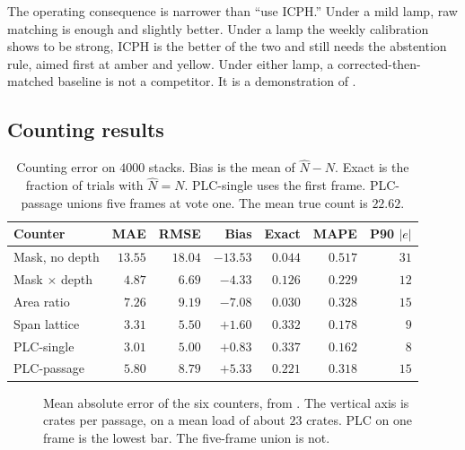 The operating consequence is narrower than ``use ICPH.'' Under a mild lamp, raw matching is enough and slightly better. Under a lamp the weekly calibration shows to be strong, ICPH is the better of the two and still needs the abstention rule, aimed first at amber and yellow. Under either lamp, a corrected-then-matched baseline is not a competitor. It is a demonstration of .

\subsection{Counting results}
\label{sec:count-results}

\begin{table}[t]
\centering
\caption{Counting error on $4000$ stacks. Bias is the mean of $\hat{N}-N$. Exact is the fraction of trials with $\hat{N}=N$. PLC-single uses the first frame. PLC-passage unions five frames at vote one. The mean true count is $22.62$.}
\label{tab:count}
\small
\begin{tabular}{@{}lrrrrrr@{}}
\toprule
Counter & MAE & RMSE & Bias & Exact & MAPE & P90 $\lvert e\rvert$ \\
\midrule
Mask, no depth & $13.55$ & $18.04$ & $-13.53$ & $0.044$ & $0.517$ & $31$ \\
Mask $\times$ depth & $4.87$ & $6.69$ & $-4.33$ & $0.126$ & $0.229$ & $12$ \\
Area ratio & $7.26$ & $9.19$ & $-7.08$ & $0.030$ & $0.328$ & $15$ \\
Span lattice & $3.31$ & $5.50$ & $+1.60$ & $0.332$ & $0.178$ & $9$ \\
PLC-single & $3.01$ & $5.00$ & $+0.83$ & $0.337$ & $0.162$ & $8$ \\
PLC-passage & $5.80$ & $8.79$ & $+5.33$ & $0.221$ & $0.318$ & $15$ \\
\bottomrule
\end{tabular}
\end{table}

\begin{figure}[t]
\centering
{}
\caption{Mean absolute error of the six counters, from . The vertical axis is crates per passage, on a mean load of about $23$ crates. PLC on one frame is the lowest bar. The five-frame union is not.}
\label{fig:count-bars}
\end{figure}

